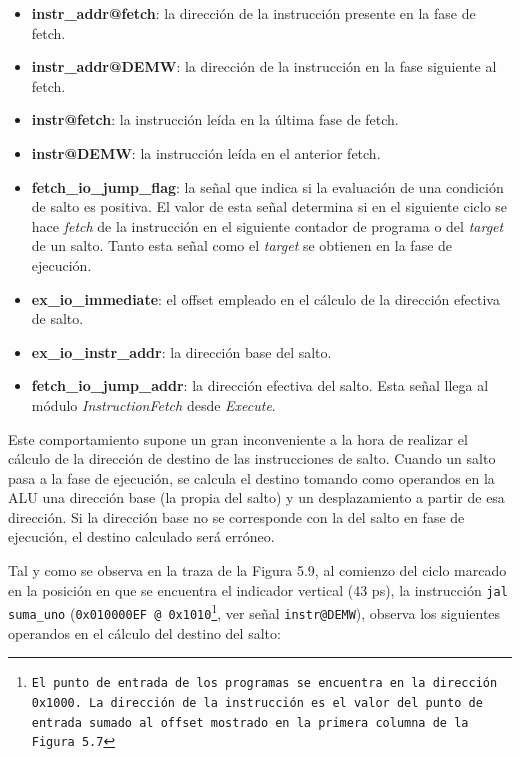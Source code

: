 \begin{itemize}
  \item{\textbf{instr\_addr@fetch}: la dirección de la instrucción presente en la fase de fetch.}
  \vspace{-0.2cm}
  \item{\textbf{instr\_addr@DEMW}: la dirección de la instrucción en la fase siguiente al fetch.}
  \vspace{-0.2cm}
  \item{\textbf{instr@fetch}: la instrucción leída en la última fase de fetch.}
  \vspace{-0.2cm}
  \item{\textbf{instr@DEMW}: la instrucción leída en el anterior fetch.}
  \vspace{-0.2cm}
  \item{\textbf{fetch\_io\_jump\_flag}: la señal que indica si la evaluación de una condición de salto es positiva. El valor de esta señal determina si en el siguiente ciclo se hace \textit{fetch} de la instrucción en el siguiente contador de programa o del \textit{target} de un salto.  Tanto esta señal como el \textit{target} se obtienen en la fase de ejecución.}
  \vspace{-0.2cm}
  \item{\textbf{ex\_io\_immediate}: el offset empleado en el cálculo de la dirección efectiva de salto.}
  \vspace{-0.2cm}
  \item{\textbf{ex\_io\_instr\_addr}: la dirección base del salto.}
  \vspace{-0.2cm}
  \item{\textbf{fetch\_io\_jump\_addr}: la dirección efectiva del salto. Esta señal llega al módulo \textit{InstructionFetch} desde \textit{Execute}.}
\end{itemize}

Este comportamiento supone un gran inconveniente a la hora de realizar el cálculo de la dirección de destino de las instrucciones de salto. Cuando un salto pasa a la fase de ejecución, se calcula el destino tomando como operandos en la ALU una dirección base (la propia del salto) y un desplazamiento a partir de esa dirección. Si la dirección base no se corresponde con la del salto en fase de ejecución, el destino calculado será erróneo.

Tal y como se observa en la traza de la Figura 5.9, al comienzo del ciclo marcado en la posición en que se encuentra el indicador vertical (43 ps), la instrucción \texttt{jal suma\_uno} (\texttt{0x010000EF @ 0x1010\footnote{El punto de entrada de los programas se encuentra en la dirección \texttt{0x1000}. La dirección de la instrucción es el valor del punto de entrada sumado al offset mostrado en la primera columna de la Figura 5.7}}, ver señal \texttt{instr@DEMW}), observa los siguientes operandos en el cálculo del destino del salto:

